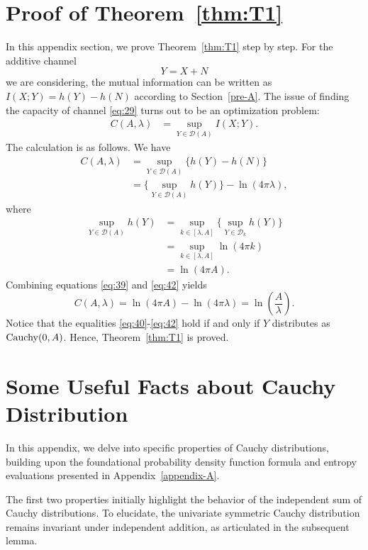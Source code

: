 \documentclass[conference]{IEEEtran}
\theoremstyle{definition}
\theoremstyle{plain}
\begin{document}
\section{Proof of Theorem~\ref{thm:T1}}
In this appendix section, we prove Theorem~\ref{thm:T1} step by step.
For the additive channel
\begin{equation}
    Y=X+N
\end{equation}
we are considering, the mutual information can be written as
$I(X;Y)=h(Y)-h(N)$ according to Section~\ref{pre-A}. The issue of finding the capacity of channel \eqref{eq:29} turns out to be an optimization problem:
\begin{align}
    C(A,\lambda)&=\sup_{Y\in\mathcal{D}(A)} I(X;Y).
\end{align}
The calculation is as follows. We have
\begin{align}
    C(A,\lambda)
    &=\sup_{Y \in \mathcal{D}(A)} \Big\{h(Y) - h(N)\Big\}\\
    &=\Big\{\sup_{Y \in \mathcal{D}(A)} h(Y)\Big\} - \ln(4\pi\lambda), \label{eq:39}
\end{align}
where
\begin{align}
    \sup_{Y \in \mathcal{D}(A)} h(Y)
    &=
    \sup_{k\in[\lambda,A]}
    \Big\{ \sup_{Y\in \mathcal{D}_k} h(Y) \Big\}\label{eq:40}\\
    &=
    \sup_{k\in[\lambda,A]}
    \ln(4\pi k) \label{eq:41}\\
    &= \ln(4\pi A). \label{eq:42}
\end{align}
Combining equations \eqref{eq:39} and \eqref{eq:42} yields
\begin{equation}
    C(A,\lambda) = 
    \ln(4\pi A) - \ln(4\pi \lambda) = \ln\left(\dfrac{A}{\lambda}\right).
\end{equation}
Notice that the equalities \eqref{eq:40}-\eqref{eq:42} hold if and only if $Y$ distributes as ${\rm Cauchy}(0,A)$. Hence, Theorem~\ref{thm:T1} is proved.
\label{appendix-B}

\section{Some Useful Facts about Cauchy Distribution}\label{pre-B}
\color{black}
In this appendix, we delve into specific properties of Cauchy distributions, building upon the foundational probability density function formula and entropy evaluations presented in Appendix~\ref{appendix-A}. 

The first two properties initially highlight the behavior of the independent sum of Cauchy distributions. To elucidate, the univariate symmetric Cauchy distribution remains invariant under independent addition, as articulated in the subsequent lemma.
\end{document}
